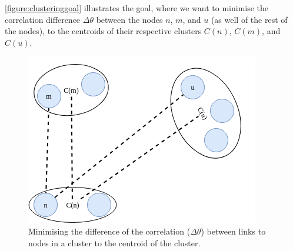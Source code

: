 
\autoref{figure:clusteringgoal} illustrates the goal, where we want to minimise the correlation difference $\Delta\theta$ between the nodes $n$, $m$, and $u$ (as well of the rest of the nodes), to the centroids of their respective clusters $C(n)$, $C(m)$, and $C(u)$.

\begin{figure}[ht]
    \centering
    \includegraphics[width=.5\textwidth]{figures/clustering/clustering.png}
    \caption{Minimising the difference of the correlation ($\Delta\theta$) between links to nodes in a cluster to the centroid of the cluster.}
    \label{figure:clusteringgoal}
\end{figure}





